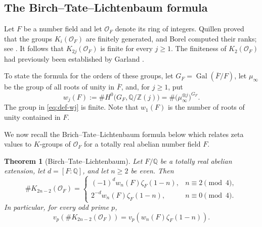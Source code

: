 \documentclass[11pt,table]{amsart}
\newtheorem{theorem}{Theorem}[section]
\newcommand{\cO}{\mathcal{O}}
\numberwithin{equation}{section}
\begin{document}
\subsection{The Birch--Tate--Lichtenbaum formula}
\label{subsec:BTL-formula}

\par Let \(F\) be a number field and let \(\mathcal O_F\) denote its
ring of integers. Quillen proved that the groups
\(K_i(\mathcal O_F)\) are finitely generated, and Borel computed their
ranks; see \cite{Quillen1973,Borel1977}. It follows that
\(K_{2j}(\mathcal O_F)\) is finite for every \(j\geq 1\). The
finiteness of \(K_2(\mathcal O_F)\) had previously been established by
Garland \cite{Garland1971}.

\par To state the formula for the orders of these groups, let
\(G_F=\operatorname{Gal}(\overline F/F)\), let \(\mu_\infty\) be the
group of all roots of unity in \(\overline F\), and, for \(j\geq 1\),
put
\begin{equation}
        w_j(F)
        :=
        \#H^0\bigl(G_F,\mathbb Q/\mathbb Z(j)\bigr)
        =
        \#\bigl(\mu_\infty^{\otimes j}\bigr)^{G_F}.
        \label{eq:def-wj}
\end{equation}
The group in \eqref{eq:def-wj} is finite. Note that $w_1(F)$ is the number of roots of unity contained in $F$. 
\par We now recall the Brich--Tate--Lichtenbaum formula below which relates zeta values to $K$-groups of $\cO_F$ for a totally real abelian number field $F$.

\begin{theorem}[Birch--Tate--Lichtenbaum]
\label{thm:BTL-exact}
Let \(F/\mathbb Q\) be a totally real abelian extension, let
\(d=[F:\mathbb Q]\), and let \(n\geq 2\) be even. Then
\begin{equation}
        \#K_{2n-2}(\mathcal O_F)
        =
        \begin{cases}
        (-1)^{d}w_n(F)\zeta_F(1-n),
            & n\equiv 2\pmod 4,\\[4pt]
        2^{-d}w_n(F)\zeta_F(1-n),
            & n\equiv 0\pmod 4.
        \end{cases}
        \label{eq:BTL-exact}
\end{equation}
In particular, for every odd prime \(p\),
\begin{equation}
        v_p\!\left(\#K_{2n-2}(\mathcal O_F)\right)
        =
        v_p\!\left(w_n(F)\zeta_F(1-n)\right).
        \label{eq:BTL-odd-primary}
\end{equation}
\end{theorem}
\end{document}
